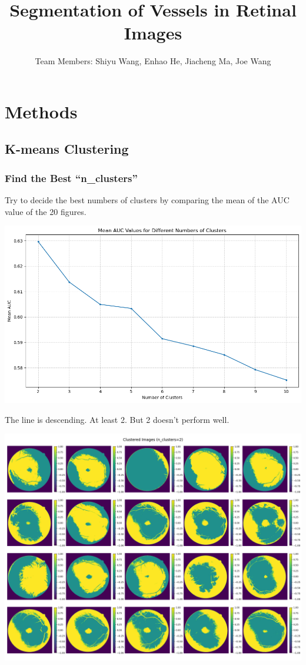 \documentclass[12pt,letterpaper]{article}
\begin{document}
\title{\textbf{Segmentation of Vessels in Retinal Images}}
\author{Team Members: Shiyu Wang, Enhao He, Jiacheng Ma, Joe Wang}
\date{}
\setlength{\droptitle}{-2.75cm}
\maketitle
\vspace{-2cm}


\section{Methods}
\subsection{K-means Clustering}
\subsubsection{Find the Best ``n\_clusters''}
Try to decide the best numbers of clusters by comparing the mean of the AUC value of the 20 figures. 
\begin{center}
    \includegraphics[scale=0.6]{Figures/1-1 Find the Best n_clusters.png}
\end{center}
The line is descending. At least 2. But 2 doesn't perform well. 
\begin{center}
    \includegraphics[scale=0.3]{Figures/1-2 2 Clusters.png}
\end{center}
\end{document}
